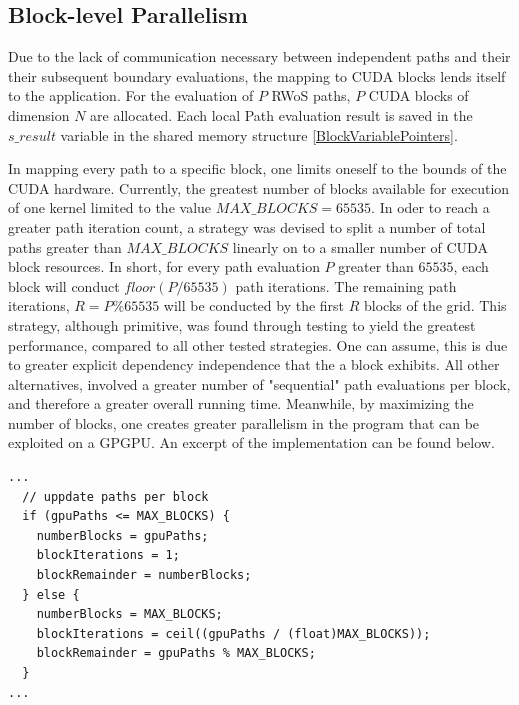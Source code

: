 \subsection{Block-level Parallelism}
Due to the lack of communication necessary between independent paths and their
their subsequent boundary evaluations, the mapping to \Gls{CUDA} blocks lends itself
to the  application.  For the evaluation of $P$ \Gls{RWoS} paths, $P$ CUDA blocks
of dimension $N$ are allocated.  Each local Path evaluation result is saved in the $s\_result$
variable in the shared memory structure \ref{BlockVariablePointers}.
\par
In mapping every path to a specific block, one limits oneself to the bounds of the
CUDA hardware.  Currently, the greatest number of blocks available for execution
of one kernel limited to the value $MAX\_BLOCKS = 65535$.  In oder to reach a greater
path iteration count, a strategy was devised to split a number of total paths greater
than $MAX\_BLOCKS$ linearly on to a smaller number of \Gls{CUDA} block resources.  In short,
for every path evaluation $P$ greater than $65535$, each block will conduct $floor(P/65535)$
path iterations. The remaining path iterations, $R = P \% 65535$ will be conducted
 by the first $R$ blocks of the grid.  This strategy,
although primitive, was found through testing to yield the greatest performance,
compared to all other tested strategies. One can assume, this is due to greater
explicit dependency independence that the a block exhibits.  All other alternatives,
involved a greater number of "sequential" path evaluations per block, and therefore
a greater overall running time.   Meanwhile, by maximizing the number of blocks,
one creates greater parallelism in the program that can be exploited on a \Gls{GPGPU}.
An excerpt of the implementation can be found below.

\begin{lstlisting}[caption="src/gpu\_config.cpp Appendix \ref{appendix}",label=block-parallelism-strategy]
  ...
  // uppdate paths per block
  if (gpuPaths <= MAX_BLOCKS) {
    numberBlocks = gpuPaths;
    blockIterations = 1;
    blockRemainder = numberBlocks;
  } else {
    numberBlocks = MAX_BLOCKS;
    blockIterations = ceil((gpuPaths / (float)MAX_BLOCKS));
    blockRemainder = gpuPaths % MAX_BLOCKS;
  }
...
\end{lstlisting}

